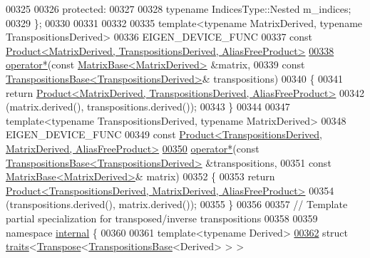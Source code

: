 \begin{DoxyCode}
00325 
00326   \textcolor{keyword}{protected}:
00327 
00328     \textcolor{keyword}{typename} IndicesType::Nested m\_indices;
00329 \};
00330 
00331 
00332 
00335 \textcolor{keyword}{template}<\textcolor{keyword}{typename} MatrixDerived, \textcolor{keyword}{typename} TranspositionsDerived>
00336 EIGEN\_DEVICE\_FUNC
00337 \textcolor{keyword}{const} \hyperlink{group___core___module_class_eigen_1_1_product}{Product<MatrixDerived, TranspositionsDerived, AliasFreeProduct>}
\hyperlink{namespace_eigen_a8b493da0816bfa75429961b75f21d780}{00338} \hyperlink{namespace_eigen_a32970f7eb62fe31eeefee72d24a046d0}{operator*}(\textcolor{keyword}{const} \hyperlink{group___core___module_class_eigen_1_1_matrix_base}{MatrixBase<MatrixDerived>} &matrix,
00339           \textcolor{keyword}{const} \hyperlink{class_eigen_1_1_transpositions_base}{TranspositionsBase<TranspositionsDerived>}& 
      transpositions)
00340 \{
00341   \textcolor{keywordflow}{return} \hyperlink{group___core___module_class_eigen_1_1_product}{Product<MatrixDerived, TranspositionsDerived, AliasFreeProduct>}
00342             (matrix.derived(), transpositions.derived());
00343 \}
00344 
00347 \textcolor{keyword}{template}<\textcolor{keyword}{typename} TranspositionsDerived, \textcolor{keyword}{typename} MatrixDerived>
00348 EIGEN\_DEVICE\_FUNC
00349 \textcolor{keyword}{const} \hyperlink{group___core___module_class_eigen_1_1_product}{Product<TranspositionsDerived, MatrixDerived, AliasFreeProduct>}
\hyperlink{namespace_eigen_a4c63a9e3b8c513835a3b5551d98bd0c3}{00350} \hyperlink{namespace_eigen_a32970f7eb62fe31eeefee72d24a046d0}{operator*}(\textcolor{keyword}{const} \hyperlink{class_eigen_1_1_transpositions_base}{TranspositionsBase<TranspositionsDerived>}
       &transpositions,
00351           \textcolor{keyword}{const} \hyperlink{group___core___module_class_eigen_1_1_matrix_base}{MatrixBase<MatrixDerived>}& matrix)
00352 \{
00353   \textcolor{keywordflow}{return} \hyperlink{group___core___module_class_eigen_1_1_product}{Product<TranspositionsDerived, MatrixDerived, AliasFreeProduct>}
00354             (transpositions.derived(), matrix.derived());
00355 \}
00356 
00357 \textcolor{comment}{// Template partial specialization for transposed/inverse transpositions}
00358 
00359 \textcolor{keyword}{namespace }\hyperlink{namespaceinternal}{internal} \{
00360 
00361 \textcolor{keyword}{template}<\textcolor{keyword}{typename} Derived>
\hyperlink{struct_eigen_1_1internal_1_1traits_3_01_transpose_3_01_transpositions_base_3_01_derived_01_4_01_4_01_4}{00362} \textcolor{keyword}{struct }\hyperlink{struct_eigen_1_1internal_1_1traits}{traits}<\hyperlink{group___core___module_class_eigen_1_1_transpose}{Transpose}<\hyperlink{class_eigen_1_1_transpositions_base}{TranspositionsBase}<Derived> > >

\end{DoxyCode}
